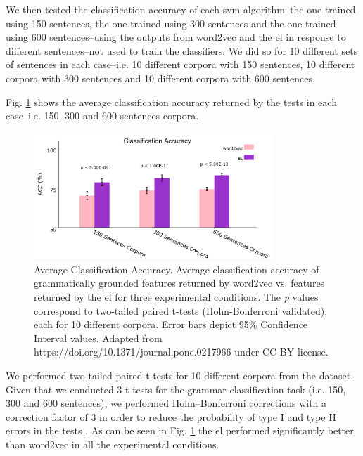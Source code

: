 {We then tested the classification accuracy of each \gls{svm} algorithm--the one trained using 150 sentences, the one trained using 300 sentences and the one trained using 600 sentences--using the outputs from word2vec and the \gls{el} in response to different sentences--not used to train the classifiers. We did so for 10 different sets of sentences in each case--i.e. 10 different corpora with 150 sentences, 10 different corpora with 300 sentences and 10 different corpora with 600 sentences.

Fig. \ref{fig:Grammar_PLOT} shows the average classification accuracy returned by the tests in each case--i.e. 150, 300 and 600 sentences corpora. 

\begin{figure}[ht!]
    \centering
    \includegraphics[width=0.8\textwidth]{Grammar_PLOT.png}
    \caption{Average Classification Accuracy. Average classification accuracy of grammatically grounded features returned by word2vec vs. features returned by the \gls{el} for three experimental conditions. The \emph{p} values correspond to two-tailed paired t-tests (Holm-Bonferroni validated); each for 10 different corpora. Error bars depict 95\% Confidence Interval values. Adapted from https://doi.org/10.1371/journal.pone.0217966 under CC-BY license.}
    \label{fig:Grammar_PLOT}
\end{figure}
  
We performed two-tailed paired t-tests for 10 different corpora from the dataset. Given that we conducted 3 t-tests for the grammar classification task (i.e. 150, 300 and 600 sentences), we performed Holm–Bonferroni corrections with a correction factor of 3 in order to reduce the probability of
type I and type II errors in the tests \cite{10.1093/biomet/75.2.383}. As can be seen in Fig. \ref{fig:Grammar_PLOT} the \gls{el} performed significantly better than word2vec in all the experimental conditions.
}


















